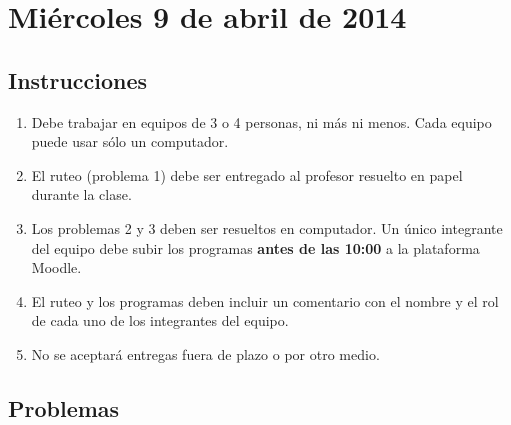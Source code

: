 \documentclass[11pt,spanish]{article}
\begin{document}
  \thispagestyle{empty}
  \pagestyle{empty}
  \section*{Miércoles 9 de abril de 2014}

  \subsection*{Instrucciones}

  \begin{enumerate}[leftmargin=0pt,label=\emph{\alph*})]

    \item
      Debe trabajar en equipos de 3 o 4 personas, ni más ni menos.
      Cada equipo puede usar sólo un computador.
    \item
      El ruteo (problema 1) debe ser entregado al profesor
      resuelto en papel durante la clase.
    \item
      Los problemas 2 y 3 deben ser resueltos en computador.
      Un único integrante del equipo debe subir los programas
      \textbf{antes de las 10:00} a la plataforma Moodle.
    \item
      El ruteo y los programas deben incluir un comentario
      con el nombre y el rol de cada uno
      de los integrantes del equipo.
    \item
      No se aceptará entregas fuera de plazo o por otro medio.

  \end{enumerate}

  \subsection*{Problemas}

  \begin{certamen}
    \item
      
    \item
      
      \newpage
    \item
      
  \end{certamen}
\end{document}
